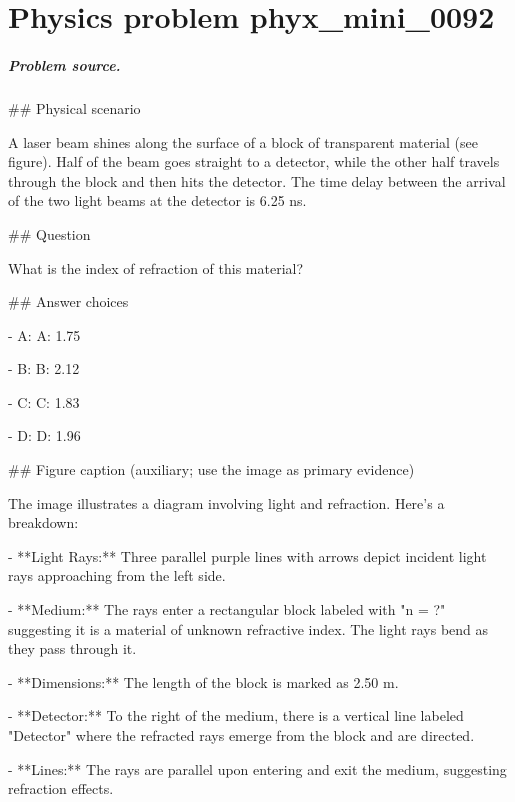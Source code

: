 
\chapter{Physics problem phyx\_mini\_0092}
\label{ch:PhyXMiniProblems_problem_phyx_mini_0092}

\paragraph{Problem source.}
\#\# Physical scenario

A laser beam shines along the surface of a block of transparent material (see figure). Half of the beam goes straight to a detector, while the other half travels through the block and then hits the detector. The time delay between the arrival of the two light beams at the detector is 6.25 ns.

\#\# Question

What is the index of refraction of this material?

\#\# Answer choices

- A: A: 1.75

- B: B: 2.12

- C: C: 1.83

- D: D: 1.96

\#\# Figure caption (auxiliary; use the image as primary evidence)

The image illustrates a diagram involving light and refraction. Here's a breakdown:

- **Light Rays:** Three parallel purple lines with arrows depict incident light rays approaching from the left side.
  
- **Medium:** The rays enter a rectangular block labeled with "n = ?" suggesting it is a material of unknown refractive index. The light rays bend as they pass through it.
  
- **Dimensions:** The length of the block is marked as 2.50 m.

- **Detector:** To the right of the medium, there is a vertical line labeled "Detector" where the refracted rays emerge from the block and are directed.

- **Lines:** The rays are parallel upon entering and exit the medium, suggesting refraction effects.

